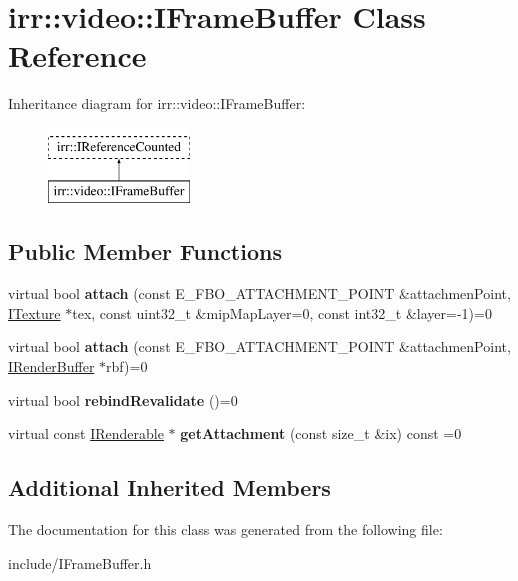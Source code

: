 \hypertarget{classirr_1_1video_1_1IFrameBuffer}{}\section{irr\+:\+:video\+:\+:I\+Frame\+Buffer Class Reference}
\label{classirr_1_1video_1_1IFrameBuffer}
Inheritance diagram for irr\+:\+:video\+:\+:I\+Frame\+Buffer\+:\begin{figure}[H]
\begin{center}
\leavevmode
\includegraphics[height=2.000000cm]{classirr_1_1video_1_1IFrameBuffer}
\end{center}
\end{figure}
\subsection*{Public Member Functions}
\begin{DoxyCompactItemize}
\item 
virtual bool {\bfseries attach} (const E\+\_\+\+F\+B\+O\+\_\+\+A\+T\+T\+A\+C\+H\+M\+E\+N\+T\+\_\+\+P\+O\+I\+NT \&attachmen\+Point, \hyperlink{classirr_1_1video_1_1ITexture}{I\+Texture} $\ast$tex, const uint32\+\_\+t \&mip\+Map\+Layer=0, const int32\+\_\+t \&layer=-\/1)=0\hypertarget{classirr_1_1video_1_1IFrameBuffer_a5be8733620e5a5cd78fcb18405df2fd6}{}\label{classirr_1_1video_1_1IFrameBuffer_a5be8733620e5a5cd78fcb18405df2fd6}

\item 
virtual bool {\bfseries attach} (const E\+\_\+\+F\+B\+O\+\_\+\+A\+T\+T\+A\+C\+H\+M\+E\+N\+T\+\_\+\+P\+O\+I\+NT \&attachmen\+Point, \hyperlink{classirr_1_1video_1_1IRenderBuffer}{I\+Render\+Buffer} $\ast$rbf)=0\hypertarget{classirr_1_1video_1_1IFrameBuffer_a1c7e8a45b7c1e2717df3c10902fef62a}{}\label{classirr_1_1video_1_1IFrameBuffer_a1c7e8a45b7c1e2717df3c10902fef62a}

\item 
virtual bool {\bfseries rebind\+Revalidate} ()=0\hypertarget{classirr_1_1video_1_1IFrameBuffer_aaf227a8a7aee3bbec5477a1edaf90382}{}\label{classirr_1_1video_1_1IFrameBuffer_aaf227a8a7aee3bbec5477a1edaf90382}

\item 
virtual const \hyperlink{classirr_1_1video_1_1IRenderable}{I\+Renderable} $\ast$ {\bfseries get\+Attachment} (const size\+\_\+t \&ix) const  =0\hypertarget{classirr_1_1video_1_1IFrameBuffer_a93148ef68e94fb5edf44a79a27ccd35a}{}\label{classirr_1_1video_1_1IFrameBuffer_a93148ef68e94fb5edf44a79a27ccd35a}

\end{DoxyCompactItemize}
\subsection*{Additional Inherited Members}


The documentation for this class was generated from the following file\+:\begin{DoxyCompactItemize}
\item 
include/I\+Frame\+Buffer.\+h\end{DoxyCompactItemize}
